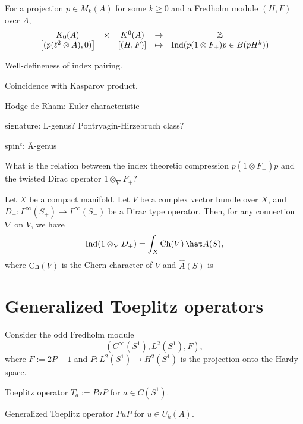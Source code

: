 \documentclass{../../large}
\begin{document}
\begin{prb}
For a projection $p\in M_k(A)$ for some $k\ge0$ and a Fredholm module $(H,F)$ over $A$,
\[\begin{array}{ccccc}
K_0(A)&\times&K^0(A)&\to&\mathbb{Z}\\
\left[(p(\ell^2\otimes A),0)\right]&&\left[(H,F)\right]&\mapsto&\operatorname{Ind}(p(1\otimes F_+)p\in B(pH^k))
\end{array}\]
\end{prb}
\begin{pf}
Well-defineness of index pairing.

Coincidence with Kasparov product.
\end{pf}


\begin{prb}
\end{prb}

\begin{prb}
Hodge de Rham: Euler characteristic

signature: L-genus? Pontryagin-Hirzebruch class?

spin$^c$: \^A-genus
\end{prb}

What is the relation between the index theoretic compression $p(1\otimes F_+)p$ and the twisted Dirac operator $1\otimes_\nabla F_+$?

\begin{prb}
Let $X$ be a compact manifold.
Let $V$ be a complex vector bundle over $X$, and $D_+:\Gamma^\infty(S_+)\to\Gamma^\infty(S_-)$ be a Dirac type operator.
Then, for any connection $\nabla$ on $V$, we have
\[\Ind(1\otimes_\nabla D_+)=\int_X\operatorname{Ch}(V)\,\hat A(S),\]
where $\mathrm{Ch}(V)$ is the Chern character of $V$ and $\hat A(S)$ is

\end{prb}





\section{Generalized Toeplitz operators}



\begin{prb}
Consider the odd Fredholm module
\[(C^\infty(S^1),L^2(S^1),F),\]
where $F:=2P-1$ and $P:L^2(S^1)\to H^2(S^1)$ is the projection onto the Hardy space.

Toeplitz operator $T_a:=PaP$ for $a\in C(S^1)$.

Generalized Toeplitz operator $PuP$ for $u\in U_k(A)$.
\end{prb}
\end{document}
